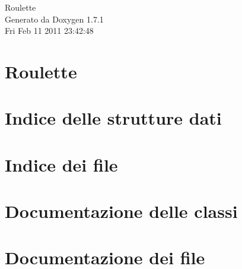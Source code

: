\documentclass[a4paper]{book}
\begin{document}
\hypersetup{pageanchor=false}
\begin{titlepage}
\vspace*{7cm}
\begin{center}
{\Large Roulette }\\
\vspace*{1cm}
{\large Generato da Doxygen 1.7.1}\\
\vspace*{0.5cm}
{\small Fri Feb 11 2011 23:42:48}\\
\end{center}
\end{titlepage}
\clearemptydoublepage
{}
\tableofcontents
\clearemptydoublepage
{}
\hypersetup{pageanchor=true}
\chapter{Roulette}
\label{index}\hypertarget{index}{}
\chapter{Indice delle strutture dati}

\chapter{Indice dei file}

\chapter{Documentazione delle classi}










\chapter{Documentazione dei file}





\printindex
\end{document}
